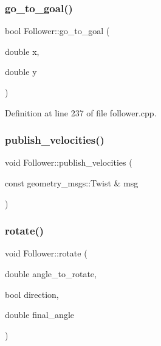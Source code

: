 \mbox{\label{class_follower_a08ab05cb32f0e6653939163dd22f344a}} 
\subsubsection{\texorpdfstring{go\+\_\+to\+\_\+goal()}{go\_to\_goal()}}
{\footnotesize\ttfamily bool Follower\+::go\+\_\+to\+\_\+goal (\begin{DoxyParamCaption}\item[{double}]{x,  }\item[{double}]{y }\end{DoxyParamCaption})}



Definition at line 237 of file follower.\+cpp.

\mbox{\label{class_follower_aaae1600959a929c269d557d9c09ba777}} 
\subsubsection{\texorpdfstring{publish\+\_\+velocities()}{publish\_velocities()}}
{\footnotesize\ttfamily void Follower\+::publish\+\_\+velocities (\begin{DoxyParamCaption}\item[{const geometry\+\_\+msgs\+::\+Twist \&}]{msg }\end{DoxyParamCaption})}

\mbox{\label{class_follower_abf8ec0da50295140bf750d30906a726b}} 
\subsubsection{\texorpdfstring{rotate()}{rotate()}}
{\footnotesize\ttfamily void Follower\+::rotate (\begin{DoxyParamCaption}\item[{double}]{angle\+\_\+to\+\_\+rotate,  }\item[{bool}]{direction,  }\item[{double}]{final\+\_\+angle }\end{DoxyParamCaption})}



